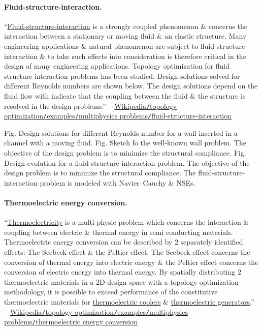 \documentclass[oneside]{book}
\numberwithin{equation}{section}
\begin{document}
\paragraph{Fluid-structure-interaction.} ``\href{https://en.wikipedia.org/wiki/Fluid%E2%80%93structure_interaction}{Fluid-structure-interaction} is a strongly coupled phenomenon \& concerns the interaction between a stationary or moving fluid \& an elastic structure. Many engineering applications \& natural phenomenon are subject to fluid-structure interaction \& to take such effects into consideration is therefore critical in the design of many engineering applications. Topology optimization for fluid structure interaction problems has been studied. Design solutions solved for different Reynolds numbers are shown below. The design solutions depend on the fluid flow with indicate that the coupling between the fluid \& the structure is resolved in the design problems.'' -- \href{https://en.wikipedia.org/wiki/Topology_optimization#Fluid-structure-interaction}{Wikipedia\texttt{/}topology optimization\texttt{/}examples\texttt{/}multiphysics problems\texttt{/}fluid-structure-interaction}

\textsf{Fig. Design solutions for different Reynolds number for a wall inserted in a channel with a moving fluid.} \textsf{Fig. Sketch fo the well-known wall problem. The objective of the design problem is to minimize the structural compliance.} \textsf{Fig. Design evolution for a fluid-structure-interaction problem. The objective of the design problem is to minimize the structural compliance. The fluid-structure-interaction problem is modeled with Navier--Cauchy \& NSEs.}

\paragraph{Thermoelectric energy conversion.} ``\href{https://en.wikipedia.org/wiki/Thermoelectric_effect}{Thermoelectricity} is a multi-physic problem which concerns the interaction \& coupling between electric \& thermal energy in semi conducting materials. Thermoelectric energy conversion can be described by 2 separately identified effects: The Seebeck effect \& the Peltier effect. The Seebeck effect concerns the conversion of thermal energy into electric energy \& the Peltier effect concerns the conversion of electric energy into thermal energy. By spatially distributing 2 thermoelectric materials in a 2D design space with a topology optimization methodology, it is possible to exceed performance of the constitutive thermoelectric materials for \href{https://en.wikipedia.org/wiki/Thermoelectric_cooling}{thermoelectric coolers} \& \href{https://en.wikipedia.org/wiki/Thermoelectric_generator}{thermoelectric generators}.'' -- \href{https://en.wikipedia.org/wiki/Topology_optimization#Thermoelectric_energy_conversion}{Wikipedia\texttt{/}topology optimization\texttt{/}examples\texttt{/}multiphysics problems\texttt{/}thermoelectric energy conversion}
\end{document}
